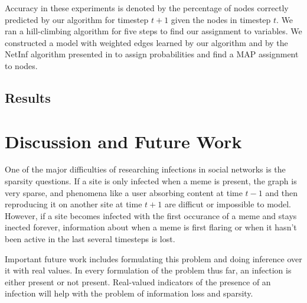 \documentclass{article} %
\begin{document}
Accuracy in these experiments is denoted by the percentage of nodes correctly predicted by our algorithm for timestep $t+1$ given the nodes in timestep $t$. We ran a hill-climbing algorithm for five steps to find our assignment to variables. We constructed a model with weighted edges learned by our algorithm and by the NetInf algorithm presented in \cite{netinf} to assign probabilities and find a MAP assignment to nodes.

\subsection{Results}
\label{results}



\section{Discussion and Future Work}
\label{discussion}

One of the major difficulties of researching infections in social networks is the sparsity questions. If a site is only infected when a meme is present, the graph is very sparse, and phenomena like a user absorbing content at time $t-1$ and then reproducing it on another site at time $t+1$ are difficut or impossible to model. However, if a site becomes infected with the first occurance of a meme and stays inected forever, information about when a meme is first flaring or when it hasn't been active in the last several timesteps is lost.

Important future work includes formulating this problem and doing inference over it with real values. In every formulation of the problem thus far, an infection is either present or not present. Real-valued indicators of the presence of an infection will help with the problem of information loss and sparsity.

{}
\label{refs}

\end{document}
